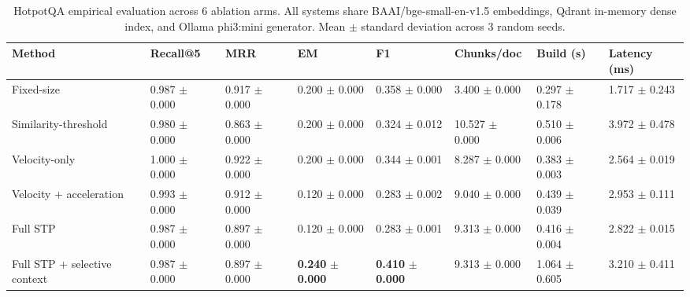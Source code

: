 \documentclass[conference]{IEEEtran}
\begin{document}
\begin{table}[t]
\centering
\caption{HotpotQA empirical evaluation across 6 ablation arms. All systems share BAAI/bge-small-en-v1.5 embeddings, Qdrant in-memory dense index, and Ollama phi3:mini generator. Mean $\pm$ standard deviation across 3 random seeds.}
\label{tab:results_hotpot}
\begin{tabularx}{\textwidth}{lXXXXXXX}
\toprule
\textbf{Method} & \textbf{Recall@5} & \textbf{MRR} & \textbf{EM} & \textbf{F1} & \textbf{Chunks/doc} & \textbf{Build (s)} & \textbf{Latency (ms)} \\
\midrule
Fixed-size & 0.987 $\pm$ 0.000 & 0.917 $\pm$ 0.000 & 0.200 $\pm$ 0.000 & 0.358 $\pm$ 0.000 & 3.400 $\pm$ 0.000 & 0.297 $\pm$ 0.178 & 1.717 $\pm$ 0.243 \\
Similarity-threshold & 0.980 $\pm$ 0.000 & 0.863 $\pm$ 0.000 & 0.200 $\pm$ 0.000 & 0.324 $\pm$ 0.012 & 10.527 $\pm$ 0.000 & 0.510 $\pm$ 0.006 & 3.972 $\pm$ 0.478 \\
Velocity-only & 1.000 $\pm$ 0.000 & 0.922 $\pm$ 0.000 & 0.200 $\pm$ 0.000 & 0.344 $\pm$ 0.001 & 8.287 $\pm$ 0.000 & 0.383 $\pm$ 0.003 & 2.564 $\pm$ 0.019 \\
Velocity + acceleration & 0.993 $\pm$ 0.000 & 0.912 $\pm$ 0.000 & 0.120 $\pm$ 0.000 & 0.283 $\pm$ 0.002 & 9.040 $\pm$ 0.000 & 0.439 $\pm$ 0.039 & 2.953 $\pm$ 0.111 \\
Full STP & 0.987 $\pm$ 0.000 & 0.897 $\pm$ 0.000 & 0.120 $\pm$ 0.000 & 0.283 $\pm$ 0.001 & 9.313 $\pm$ 0.000 & 0.416 $\pm$ 0.004 & 2.822 $\pm$ 0.015 \\
Full STP + selective context & 0.987 $\pm$ 0.000 & 0.897 $\pm$ 0.000 & \textbf{0.240} $\pm$ \textbf{0.000} & \textbf{0.410} $\pm$ \textbf{0.000} & 9.313 $\pm$ 0.000 & 1.064 $\pm$ 0.605 & 3.210 $\pm$ 0.411 \\
\bottomrule
\end{tabularx}
\end{table}
\end{document}
